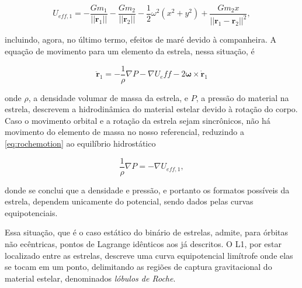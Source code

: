 \begin{equation}
    U_{eff, 1} = -\frac{Gm_1}{||\mathbf{r}_1||}-\frac{Gm_2}{||\mathbf{r}_2||}-\frac{1}{2}\omega^2(x^2 + y^2)+\frac{Gm_2x}{||\mathbf{r}_1 - \mathbf{r}_2||^2},
\end{equation}

incluindo, agora, no último termo, efeitos de maré devido à companheira. A equação de movimento para um elemento da estrela, nessa situação, é

\begin{equation}
    \label{eq:rochemotion}
    \ddot{\mathbf{r}}_1 = -\frac{1}{\rho}\nabla P - \nabla U_eff - 2\mathbf{\omega}\times\dot{\mathbf{r}}_1
\end{equation}

onde $\rho$, a densidade volumar de massa da estrela, e $P$, a pressão do material na estrela, descrevem a hidrodinâmica do material estelar devido à rotação do corpo. Caso o movimento orbital e a rotação da estrela sejam sincrônicos, não há movimento do elemento de massa no nosso referencial, reduzindo a \ref{eq:rochemotion} ao equilíbrio hidrostático

\begin{equation}
    \frac{1}{\rho}\nabla P = -\nabla U_{eff, 1},
\end{equation}

donde se conclui que a densidade e pressão, e portanto os formatos possíveis da estrela, dependem unicamente do potencial, sendo dados pelas curvas equipotenciais.

Essa situação, que é o caso estático do binário de estrelas, admite, para órbitas não ecêntricas, pontos de Lagrange idênticos aos já descritos. O L1, por estar localizado entre as estrelas, descreve uma curva equipotencial limítrofe onde elas se tocam em um ponto, delimitando as regiões de captura gravitacional do material estelar, denominados \textit{lóbulos de Roche}.